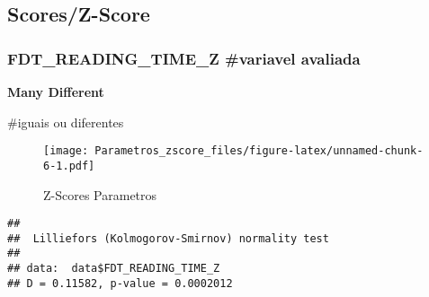 \documentclass[
]{article}
\newenvironment{Shaded}{\begin{snugshade}}{\end{snugshade}}
\newcommand{\AttributeTok}[1]{\textcolor[rgb]{0.13,0.29,0.53}{#1}}
\newcommand{\DecValTok}[1]{\textcolor[rgb]{0.00,0.00,0.81}{#1}}
\newcommand{\DocumentationTok}[1]{\textcolor[rgb]{0.56,0.35,0.01}{\textbf{\textit{#1}}}}
\newcommand{\FunctionTok}[1]{\textcolor[rgb]{0.13,0.29,0.53}{\textbf{#1}}}
\newcommand{\NormalTok}[1]{#1}
\newcommand{\OtherTok}[1]{\textcolor[rgb]{0.56,0.35,0.01}{#1}}
\newcommand{\SpecialCharTok}[1]{\textcolor[rgb]{0.81,0.36,0.00}{\textbf{#1}}}
\newcommand{\StringTok}[1]{\textcolor[rgb]{0.31,0.60,0.02}{#1}}
\begin{document}
\subsection{\texorpdfstring{\textbf{Scores/Z-Score}}{Scores/Z-Score}}\label{scoresz-score-4}

\subsubsection{FDT\_READING\_TIME\_Z \#variavel
avaliada}\label{fdt_reading_time_z-variavel-avaliada}

\textbf{Many Different}

\#iguais ou diferentes

\begin{Shaded}
\end{Shaded}

\begin{figure}
\centering
\texttt{[image: Parametros\_zscore\_files/figure-latex/unnamed-chunk-6-1.pdf]}
\caption{Z-Scores Parametros}
\end{figure}

\begin{Shaded}
\end{Shaded}

\begin{verbatim}
## 
##  Lilliefors (Kolmogorov-Smirnov) normality test
## 
## data:  data$FDT_READING_TIME_Z
## D = 0.11582, p-value = 0.0002012
\end{verbatim}
\end{document}
